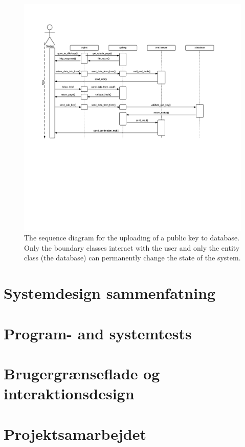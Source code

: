 \documentclass[11pt,a4paper]{report}
\begin{document}
\begin{figure}[H]
    \centering
    \includegraphics[width=1.2\textwidth]{pictures/sequence_diagram}
    \caption{The sequence diagram for the uploading of a public key to database. Only the boundary classes interact with the user and only the entity class (the database) can permanently change the state  of the system.}
    \label{fig:sequence_diagram}
\end{figure}

\section{Systemdesign sammenfatning}\label{sec:Systemdesign_sammenfatning}

\section{Program- and systemtests}\label{sec:Program_systemtests}

\section{Brugergrænseflade og interaktionsdesign}

\section{Projektsamarbejdet}
\end{document}
